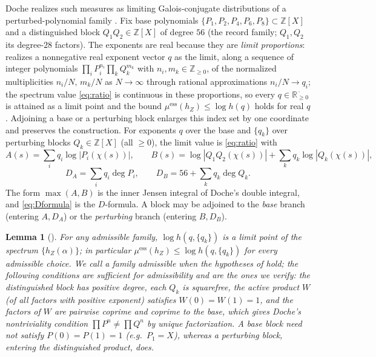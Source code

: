 \documentclass[11pt,reqno]{amsart}
\theoremstyle{plain}
\newtheorem{lemma}[theorem]{Lemma}
\theoremstyle{definition}
\newcommand{\Z}{\mathbb{Z}}
\newcommand{\R}{\mathbb{R}}
\newcommand{\hZ}{h_Z}
\newcommand{\essmin}{\mu^{\mathrm{ess}}(\hZ)}
\newcommand{\dA}{D_A}
\newcommand{\dB}{D_B}
\begin{document}
Doche realizes such measures as limiting Galois-conjugate distributions of a
perturbed-polynomial family \citep{Doc01a,Doc01b}. Fix base polynomials
$\{P_1,P_2,P_4,P_6,P_8\}\subset\Z[X]$ and a distinguished block $Q_1Q_2\in\Z[X]$ of
degree $56$ (the \citet{Doc01b} record family; $Q_1,Q_2$ its degree-$28$ factors).
The exponents are real because they are \emph{limit proportions}: \citet[\S3]{Doc01a}
realizes a nonnegative real exponent vector $q$ as the limit, along a sequence of
integer polynomials $\prod_i P_i^{n_i}\prod_k Q_k^{m_k}$ with $n_i,m_k\in\Z_{\ge0}$, of
the normalized multiplicities $n_i/N,\,m_k/N$ as $N\to\infty$ through rational
approximations $n_i/N\to q_i$; the spectrum value \eqref{eq:ratio} is continuous in
these proportions, so every $q\in\R_{\ge0}^{\,\cdot}$ is attained as a limit point and
the bound $\essmin\le\log h(q)$ holds for real $q$. Adjoining a base or a perturbing
block enlarges this index set by one coordinate and preserves the construction.
For exponents $q$ over the base and $\{q_k\}$ over perturbing blocks $Q_k\in\Z[X]$
(all $\ge0$), the limit value is \eqref{eq:ratio} with
\begin{equation}\label{eq:AB}
  A(s)=\sum_i q_i\log|P_i(\chi(s))|,\qquad
  B(s)=\log|Q_1Q_2(\chi(s))|+\sum_k q_k\log|Q_k(\chi(s))|,
\end{equation}
\begin{equation}\label{eq:Dformula}
  \dA=\textstyle\sum_i q_i\deg P_i,\qquad
  \dB=56+\sum_k q_k\deg Q_k .
\end{equation}
The form $\max(A,B)$ is the inner Jensen integral of Doche's double integral, and
\eqref{eq:Dformula} is the \citet[\S4]{Doc01a} $D$-formula. A block may be adjoined to
the \emph{base} branch (entering $A,\dA$) or the \emph{perturbing} branch
(entering $B,\dB$).

\begin{lemma}[{\citealp[Lemmas 2--5]{Doc01a}}]\label{lem:doche}
For any admissible family, $\log h(q,\{q_k\})$ is a limit point of the spectrum
$\{\hZ(\alpha)\}$; in particular $\essmin\le\log h(q,\{q_k\})$ for every admissible
choice. We call a family \emph{admissible} when the hypotheses of \citet[Lemmas
2--5]{Doc01a} hold; the following conditions are \emph{sufficient} for admissibility
and are the ones we verify: the distinguished block has positive degree, each $Q_k$ is
squarefree, the active product $W$ (of all factors with positive exponent) satisfies
$W(0)=W(1)=1$, and the factors of $W$ are pairwise coprime and coprime to the base,
which gives Doche's nontriviality condition $\prod P^n\ne\prod Q^n$ by unique
factorization. A base block need not satisfy $P(0)=P(1)=1$ (e.g.\ $P_1=X$), whereas a
perturbing block, entering the distinguished product, does.
\end{lemma}
\end{document}
